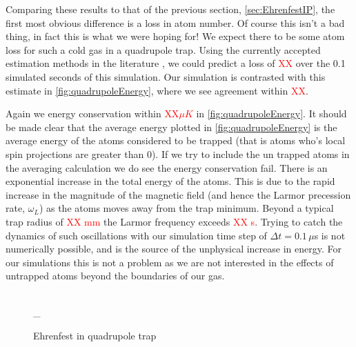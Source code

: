 Comparing these results to that of the previous section, \autoref{sec:EhrenfestIP}, the first most obvious difference is a loss in atom number.
Of course this isn't a bad thing, in fact this is what we were hoping for!
We expect there to be some atom loss for such a cold gas in a quadrupole trap.
Using the currently accepted estimation methods in the literature \cite{Lin2009,Wade2011}, we could predict a loss of \textcolor{red}{XX} over the 0.1 simulated seconds of this simulation.
Our simulation is contrasted with this estimate in \autoref{fig:quadrupoleEnergy}, where we see agreement within \textcolor{red}{XX}.

Again we energy conservation within \textcolor{red}{XX$\mu K$} in \autoref{fig:quadrupoleEnergy}.
It should be made clear that the average energy plotted in \autoref{fig:quadrupoleEnergy} is the average energy of the atoms considered to be trapped (that is atoms who's local spin projections are greater than 0).
If we try to include the un trapped atoms in the averaging calculation we do see the energy conservation fail.
There is an exponential increase in the total energy of the atoms.
This is due to the rapid increase in the magnitude of the magnetic field (and hence the Larmor precession rate, $\omega_L$) as the atoms moves away from the trap minimum.
Beyond a typical trap radius of \textcolor{red}{XX mm} the Larmor frequency exceeds \textcolor{red}{XX s}.
Trying to catch the dynamics of such oscillations with our simulation time step of $\Delta t = 0.1\, \mu$s is not numerically possible, and is the source of the unphysical increase in energy.
For our simulations this is not a problem as we are not interested in the effects of untrapped atoms beyond the boundaries of our gas.


\begin{figure}
\hspace{-12em}
\\\_
\hspace{-12em}
\caption{Ehrenfest in quadrupole trap}\label{fig:ehrenfestQuad}
\end{figure}

